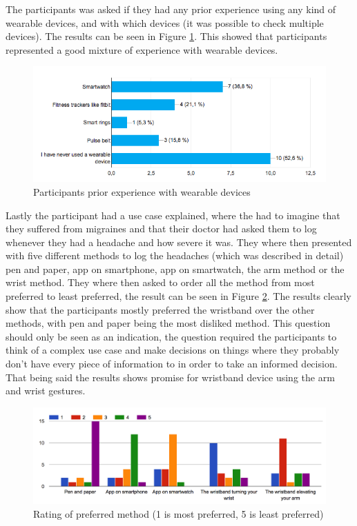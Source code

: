 The participants was asked if they had any prior experience using any kind of wearable devices, and with which devices (it was possible to check multiple devices). The results can be seen in Figure \ref{wearable_experience}. This showed that participants represented a good mixture of experience with wearable devices. 

\begin{figure}[h!]
    \centering
    \includegraphics[width=1\textwidth]{figures/wearable_experience.png}
    \caption{Participants prior experience with wearable devices}
    \label{wearable_experience}
\end{figure}

Lastly the participant had a use case explained, where the had to imagine that they suffered from migraines and that their doctor had asked them to log whenever they had a headache and how severe it was. They where then presented with five different methods to log the headaches (which was described in detail) pen and paper, app on smartphone, app on smartwatch, the arm method or the wrist method. They where then asked to order all the method from most preferred to least preferred, the result can be seen in Figure \ref{preferred_method}. The results clearly show that the participants mostly preferred the wristband over the other methods, with pen and paper being the most disliked method. This question should only be seen as an indication, the question required the participants to think of a complex use case and make decisions on things where they probably don't have every piece of information to in order to take an informed decision. That being said the results shows promise for wristband device using the arm and wrist gestures.

\begin{figure}[h!]
    \centering
    \includegraphics[width=1\textwidth]{figures/preferred_method.png}
    \caption{Rating of preferred method (1 is most preferred, 5 is least preferred)}
    \label{preferred_method}
\end{figure}

